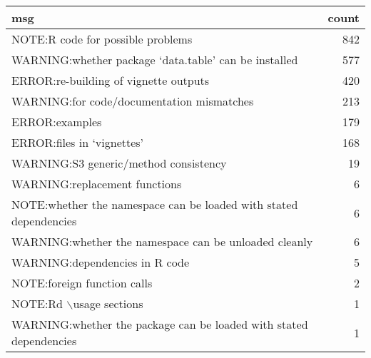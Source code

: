 \begin{tabular}{lr}
  \hline
msg & count \\ 
  \hline
NOTE:R code for possible problems & 842 \\ 
  WARNING:whether package ‘data.table’ can be installed & 577 \\ 
  ERROR:re-building of vignette outputs & 420 \\ 
  WARNING:for code/documentation mismatches & 213 \\ 
  ERROR:examples & 179 \\ 
  ERROR:files in ‘vignettes’ & 168 \\ 
  WARNING:S3 generic/method consistency & 19 \\ 
  WARNING:replacement functions &  6 \\ 
  NOTE:whether the namespace can be loaded with stated dependencies &  6 \\ 
  WARNING:whether the namespace can be unloaded cleanly &  6 \\ 
  WARNING:dependencies in R code &  5 \\ 
  NOTE:foreign function calls &  2 \\ 
  NOTE:Rd $\backslash$usage sections &  1 \\ 
  WARNING:whether the package can be loaded with stated dependencies &  1 \\ 
   \hline
\end{tabular}
